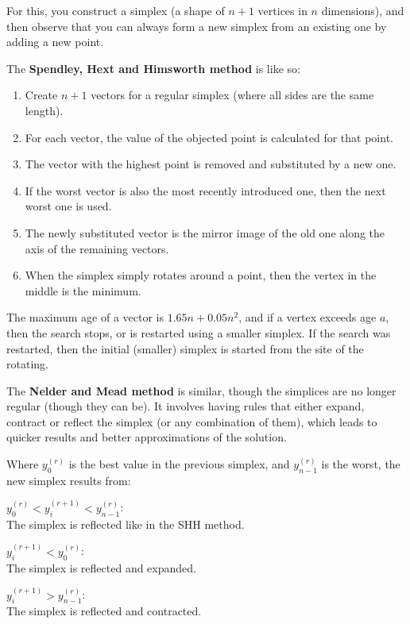 \begin{description}
    For this, you construct a simplex (a shape of $n+1$ vertices in $n$
    dimensions), and then observe that you can always form a new simplex from an
    existing one by adding a new point.

    The \textbf{Spendley, Hext and Himsworth method} is like so:

    \begin{enumerate}
      \item Create $n+1$ vectors for a regular simplex (where all sides are the
      same length).
      \item For each vector, the value of the objected point is calculated for
      that point.
      \item The vector with the highest point is removed and substituted by a 
      new one.
      \item If the worst vector is also the most recently introduced one, then
      the next worst one is used.
      \item The newly substituted vector is the mirror image of the old one
      along the axis of the remaining vectors. %
      \item When the simplex simply rotates around a point, then
      the vertex in the middle is the minimum.
    \end{enumerate}

    The maximum age of a vector is $1.65n + 0.05 n^2$, and if a vertex exceeds
    age $a$, then the search stops, or is restarted using a smaller simplex.
    If the search was restarted, then the initial (smaller) simplex is started
    from the site of the rotating.

    The \textbf{Nelder and Mead method} is similar, though the simplices are no
    longer regular (though they can be). It involves having rules that either
    expand, contract or reflect the simplex (or any combination of them), which
    leads to quicker results and better approximations of the solution.

    Where $y^{(r)}_0$ is the best value in the previous simplex, and
    $y^{(r)}_{n-1}$ is the worst, the new simplex results from:

    \begin{description}
      \item $y^{(r)}_0 < y^{(r+1)}_{i} < y^{(r)}_{n-1}$:\\
        The simplex is reflected like in the SHH method.
      \item $y^{(r+1)}_{i} < y^{(r)}_{0}$:\\
        The simplex is reflected and expanded.
      \item $y^{(r+1)}_{i} > y^{(r)}_{n-1}$:\\
        The simplex is reflected and contracted.
    \end{description}

\end{description}


